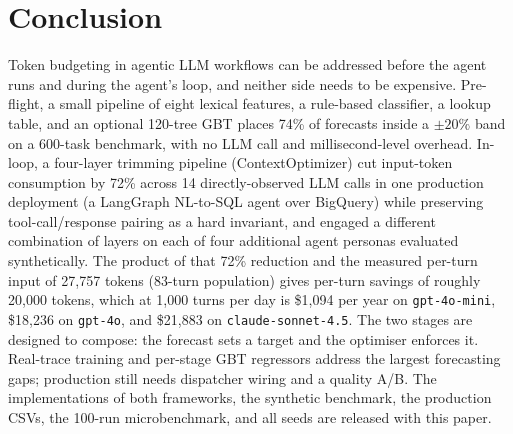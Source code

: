 \documentclass{article}
\newcommand{\code}[1]{\texttt{\small #1}}
\begin{document}
\section{Conclusion}
\label{sec:conclusion}

Token budgeting in agentic LLM workflows can be addressed before the
agent runs and during the agent's loop, and neither side needs to be
expensive. Pre-flight, a small pipeline of eight lexical features, a
rule-based classifier, a lookup table, and an optional 120-tree GBT
places 74\% of forecasts inside a $\pm 20\%$ band on a 600-task
benchmark, with no LLM call and millisecond-level overhead. In-loop,
a four-layer trimming pipeline (ContextOptimizer) cut input-token
consumption by 72\% across 14 directly-observed LLM calls in one
production deployment (a LangGraph NL-to-SQL agent over BigQuery)
while preserving tool-call/response pairing as a hard invariant,
and engaged a different combination of layers on each of four
additional agent personas evaluated synthetically. The product of that 72\% reduction and
the measured per-turn input of 27{,}757 tokens (83-turn population)
gives per-turn savings of roughly 20{,}000 tokens, which at 1{,}000
turns per day is \$1{,}094 per year on \code{gpt-4o-mini},
\$18{,}236 on \code{gpt-4o}, and \$21{,}883 on \code{claude-sonnet-4.5}.
The two stages are designed to compose: the forecast sets a target and
the optimiser enforces it. Real-trace training and per-stage GBT regressors address the largest
forecasting gaps; production still needs dispatcher wiring and a quality
A/B. The implementations of both frameworks, the synthetic benchmark,
the production CSVs, the 100-run microbenchmark, and all seeds are
released with this paper.

\FloatBarrier


\end{document}

